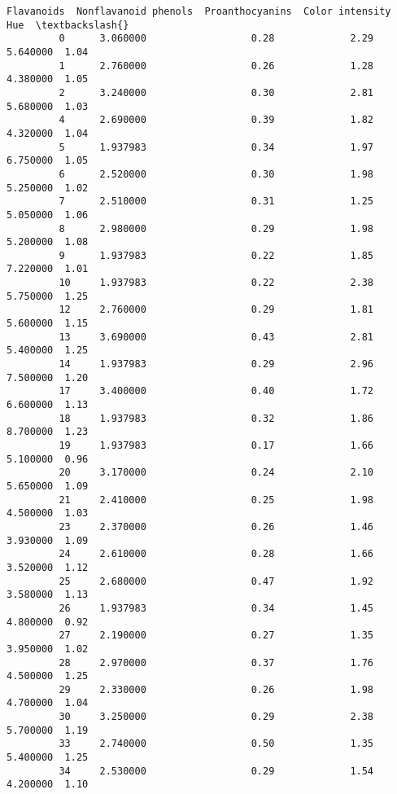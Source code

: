 \documentclass[11pt]{article}
\begin{document}
\begin{Verbatim}[commandchars=\\\{\}]
              Flavanoids  Nonflavanoid phenols  Proanthocyanins  Color intensity   Hue  \textbackslash{}
         0      3.060000                  0.28             2.29         5.640000  1.04   
         1      2.760000                  0.26             1.28         4.380000  1.05   
         2      3.240000                  0.30             2.81         5.680000  1.03   
         4      2.690000                  0.39             1.82         4.320000  1.04   
         5      1.937983                  0.34             1.97         6.750000  1.05   
         6      2.520000                  0.30             1.98         5.250000  1.02   
         7      2.510000                  0.31             1.25         5.050000  1.06   
         8      2.980000                  0.29             1.98         5.200000  1.08   
         9      1.937983                  0.22             1.85         7.220000  1.01   
         10     1.937983                  0.22             2.38         5.750000  1.25   
         12     2.760000                  0.29             1.81         5.600000  1.15   
         13     3.690000                  0.43             2.81         5.400000  1.25   
         14     1.937983                  0.29             2.96         7.500000  1.20   
         17     3.400000                  0.40             1.72         6.600000  1.13   
         18     1.937983                  0.32             1.86         8.700000  1.23   
         19     1.937983                  0.17             1.66         5.100000  0.96   
         20     3.170000                  0.24             2.10         5.650000  1.09   
         21     2.410000                  0.25             1.98         4.500000  1.03   
         23     2.370000                  0.26             1.46         3.930000  1.09   
         24     2.610000                  0.28             1.66         3.520000  1.12   
         25     2.680000                  0.47             1.92         3.580000  1.13   
         26     1.937983                  0.34             1.45         4.800000  0.92   
         27     2.190000                  0.27             1.35         3.950000  1.02   
         28     2.970000                  0.37             1.76         4.500000  1.25   
         29     2.330000                  0.26             1.98         4.700000  1.04   
         30     3.250000                  0.29             2.38         5.700000  1.19   
         33     2.740000                  0.50             1.35         5.400000  1.25   
         34     2.530000                  0.29             1.54         4.200000  1.10   

\end{Verbatim}
\end{document}
